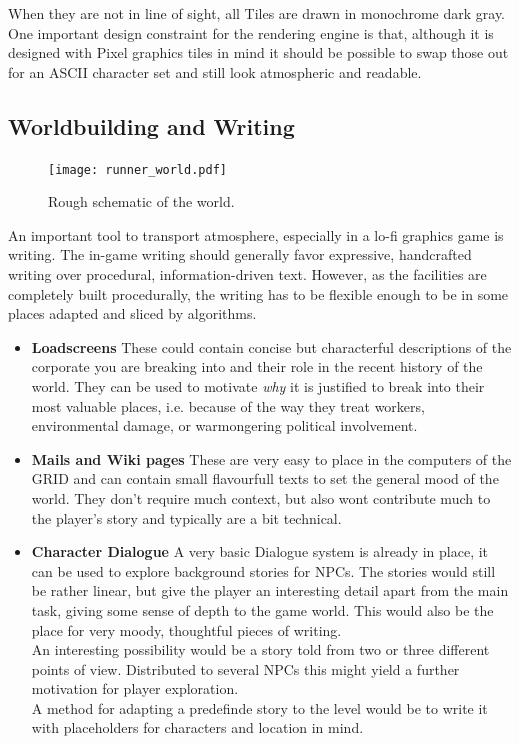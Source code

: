 \documentclass[11pt,a4paper, twocolumn]{article}
\begin{document}
When they are not in line of sight, all Tiles are drawn in monochrome dark gray.
One important design constraint for the rendering engine is that, although it is designed
with Pixel graphics tiles in mind it should be possible to swap those out for an
ASCII character set and still look atmospheric and readable.

\newpage

\subsection{Worldbuilding and Writing}

\begin{figure}
    \center
    \texttt{[image: runner\_world.pdf]}
    \caption{Rough schematic of the world.}
    \label{fig:world}
\end{figure}

An important tool to transport atmosphere, especially in a lo-fi graphics game is writing.
The in-game writing should generally favor expressive, handcrafted writing over
procedural, information-driven text. However, as the facilities are completely built
procedurally, the writing has to be flexible enough to be in some places adapted and
sliced by algorithms.

\begin{itemize}
    \item \textbf{Loadscreens} These could contain concise but characterful descriptions of the
        corporate you are breaking into and their role in the recent history of the world. They
        can be used to motivate \textit{why} it is justified to break into their most valuable
        places, i.e. because of the way they treat workers, environmental damage, or warmongering
        political involvement.
    \item \textbf{Mails and Wiki pages} These are very easy to place in the computers of the
        GRID and can contain small flavourfull texts to set the general mood of the world.
        They don't require much context, but also wont contribute much to the player's story and
        typically are a bit technical.
    \item \textbf{Character Dialogue} A very basic Dialogue system is already in place, it can be
        used to explore background stories for NPCs. The stories would still be rather linear,
        but give the player an interesting detail apart from the main task, giving some sense of
        depth to the game world. This would also be the place for very moody, thoughtful pieces of
        writing.\\
        An interesting possibility would be a story told from two or three different points of view.
        Distributed to several NPCs this might yield a further motivation for player exploration.\\
        A method for adapting a predefinde story to the level would be to write it with placeholders
        for characters and location in mind.
\end{itemize}
\end{document}
